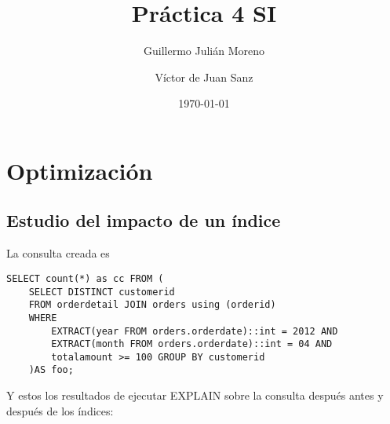 \documentclass{article}
\title{Práctica 4 SI}
\date{\today}
\author{Guillermo Julián Moreno \and Víctor de Juan Sanz}
\begin{document}
\maketitle

\section{Optimización}

\subsection{Estudio del impacto de un índice}

La consulta creada es
\begin{Verbatim}[frame = lines]
SELECT count(*) as cc FROM (
	SELECT DISTINCT customerid
	FROM orderdetail JOIN orders using (orderid)
	WHERE
		EXTRACT(year FROM orders.orderdate)::int = 2012 AND
		EXTRACT(month FROM orders.orderdate)::int = 04 AND
		totalamount >= 100 GROUP BY customerid
	)AS foo;
\end{Verbatim}

Y estos los resultados de ejecutar EXPLAIN sobre la consulta después antes y después de los índices:
\end{document}

